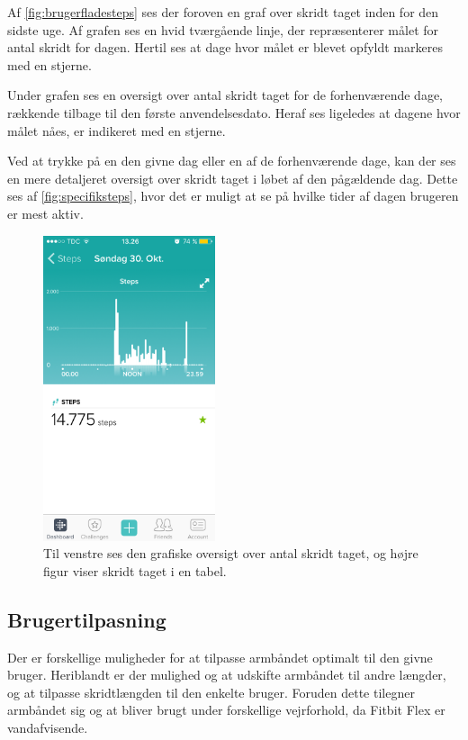 Af \autoref{fig:brugerfladesteps} ses der foroven en graf over skridt taget inden for den sidste uge. Af grafen ses en hvid tværgående linje, der repræsenterer målet for antal skridt for dagen. Hertil ses at dage hvor målet er blevet opfyldt markeres med en stjerne.  

Under grafen ses en oversigt over antal skridt taget for de forhenværende dage, rækkende tilbage til den første anvendelsesdato. Heraf ses ligeledes at dagene hvor målet nåes, er indikeret med en stjerne. 

Ved at trykke på en den givne dag eller en af de forhenværende dage, kan der ses en mere detaljeret oversigt over skridt taget i løbet af den pågældende dag. Dette ses af \autoref{fig:specifiksteps}, hvor det er muligt at se på hvilke tider af dagen brugeren er mest aktiv.  

\begin{figure}[H]
	\centering
	\includegraphics[width=0.45\textwidth]{figures/specifiksteps}
	\caption{Til venstre ses den grafiske oversigt over antal skridt taget, og højre figur viser skridt taget i en tabel.}
	\label{fig:specifiksteps}
\end{figure}


\subsection{Brugertilpasning}
Der er forskellige muligheder for at tilpasse armbåndet optimalt til den givne bruger. Heriblandt er der mulighed og at udskifte armbåndet til andre længder, og at tilpasse skridtlængden til den enkelte bruger. Foruden dette tilegner armbåndet sig og at bliver brugt under forskellige vejrforhold, da Fitbit Flex er vandafvisende. 

